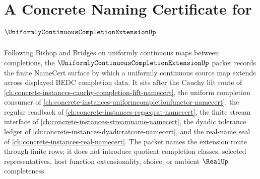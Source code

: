 \chapter{A Concrete Naming Certificate for $\UniformlyContinuousCompletionExtensionUp$}
\label{ch:concrete-instances-uniformly-continuous-completion-extension-namecert}

Following Bishop and Bridges on uniformly continuous maps between completions, the $\UniformlyContinuousCompletionExtensionUp$ packet records the finite NameCert surface by which a uniformly continuous source map extends across displayed BEDC completion data. It sits after the Cauchy lift route of \autoref{ch:concrete-instances-cauchy-completion-lift-namecert}, the uniform completion consumer of \autoref{ch:concrete-instances-uniformcompletionfunctor-namecert}, the regular readback of \autoref{ch:concrete-instances-regseqrat-namecert}, the finite stream interface of \autoref{ch:concrete-instances-streamname-namecert}, the dyadic tolerance ledger of \autoref{ch:concrete-instances-dyadicratcore-namecert}, and the real-name seal of \autoref{ch:concrete-instances-real-namecert}. The packet names the extension route through finite rows; it does not introduce quotient completion classes, selected representatives, host function extensionality, choice, or ambient $\RealUp$ completeness.

